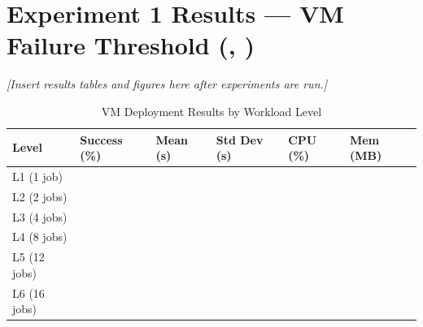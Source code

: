 \section{Experiment 1 Results --- VM Failure Threshold (, )}

\textit{[Insert results tables and figures here after experiments are run.]}

\begin{table}[H]
\centering
\caption{VM Deployment Results by Workload Level}
\label{tab:vm_results}
\begin{tabularx}{\textwidth}{lXXXXX}
\toprule
\textbf{Level} & \textbf{Success (\%)} & \textbf{Mean (s)} & \textbf{Std Dev (s)} & \textbf{CPU (\%)} & \textbf{Mem (MB)} \\
\midrule
L1 (1 job)  & & & & & \\
L2 (2 jobs) & & & & & \\
L3 (4 jobs) & & & & & \\
L4 (8 jobs) & & & & & \\
L5 (12 jobs)& & & & & \\
L6 (16 jobs)& & & & & \\
\bottomrule
\end{tabularx}
\end{table}
